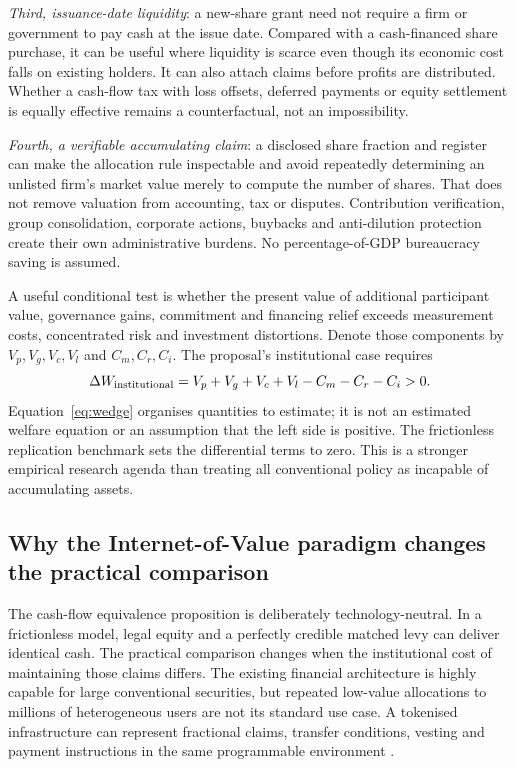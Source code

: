 \emph{Third, issuance-date liquidity}: a new-share grant need not require a firm or government to pay cash at the issue date. Compared with a cash-financed share purchase, it can be useful where liquidity is scarce even though its economic cost falls on existing holders. It can also attach claims before profits are distributed. Whether a cash-flow tax with loss offsets, deferred payments or equity settlement is equally effective remains a counterfactual, not an impossibility.

\emph{Fourth, a verifiable accumulating claim}: a disclosed share fraction and register can make the allocation rule inspectable and avoid repeatedly determining an unlisted firm's market value merely to compute the number of shares. That does not remove valuation from accounting, tax or disputes. Contribution verification, group consolidation, corporate actions, buybacks and anti-dilution protection create their own administrative burdens. No percentage-of-GDP bureaucracy saving is assumed.

A useful conditional test is whether the present value of additional participant value, governance gains, commitment and financing relief exceeds measurement costs, concentrated risk and investment distortions. Denote those components by $V_p,V_g,V_c,V_l$ and $C_m,C_r,C_i$. The proposal's institutional case requires
\begin{equation}
\Delta W_{\rm institutional}=V_p+V_g+V_c+V_l-C_m-C_r-C_i>0.\label{eq:wedge}
\end{equation}
Equation~\eqref{eq:wedge} organises quantities to estimate; it is not an estimated welfare equation or an assumption that the left side is positive. The frictionless replication benchmark sets the differential terms to zero. This is a stronger empirical research agenda than treating all conventional policy as incapable of accumulating assets.

\subsection{Why the Internet-of-Value paradigm changes the practical comparison}
The cash-flow equivalence proposition is deliberately technology-neutral. In a frictionless model, legal equity and a perfectly credible matched levy can deliver identical cash. The practical comparison changes when the institutional cost of maintaining those claims differs. The existing financial architecture is highly capable for large conventional securities, but repeated low-value allocations to millions of heterogeneous users are not its standard use case. A tokenised infrastructure can represent fractional claims, transfer conditions, vesting and payment instructions in the same programmable environment \citep{bis2023,bis2025}.

